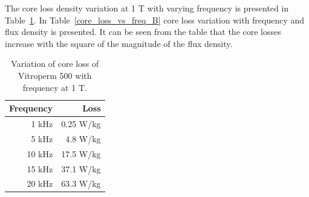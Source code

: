 \documentclass[a4paper, 11pt]{article} %
\begin{document}
The core loss density variation at 1 T with varying frequency is presented in Table~\ref{core_loss_vs_freq}. In Table~\ref{core_loss_vs_freq_B} core loss variation with frequency and flux density is presented. It can be seen from the table that the core losses increase with the square of the magnitude of the flux density. 
 
\begin{table}[]
\begin{center}
\begin{tabular}{rr}
Frequency & Loss \\
\hline
1 kHz &  0.25 W/kg\\
5 kHz &  4.8 W/kg\\
10 kHz & 17.5 W/kg\\
15 kHz & 37.1 W/kg\\
20 kHz &  63.3 W/kg\\
\hline
\end{tabular} 
\end{center}
\caption{Variation of core loss of Vitroperm 500 with frequency at 1 T.}
\label{core_loss_vs_freq}
\end{table}
\end{document}
